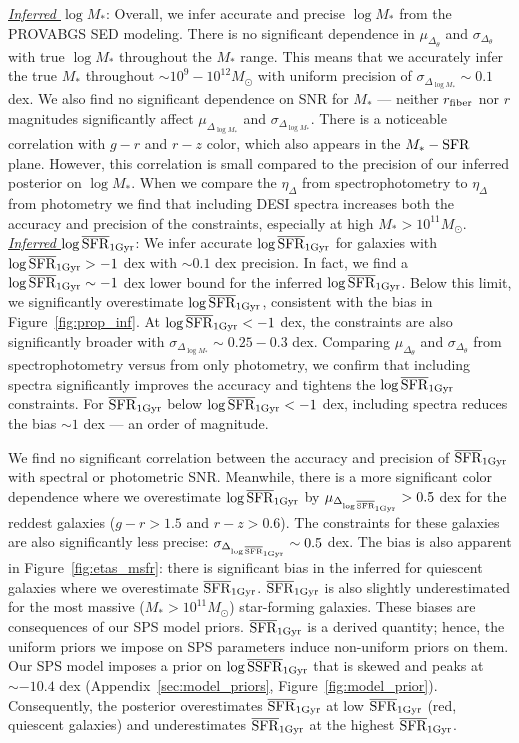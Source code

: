 \noindent \underline{\emph{Inferred $\log M_*$}}: 
Overall, we infer accurate and precise $\log M_*$ from the {\sc PROVABGS} SED
modeling. 
There is no significant dependence in $\mu_{\Delta_{\theta}}$ and
$\sigma_{\Delta_{\theta}}$ with true $\log M_*$ throughout the $M_*$ range. 
This means that we accurately infer the true $M_*$ throughout ${\sim}10^{9} -
10^{12} M_\odot$  with uniform precision of $\sigma_{\Delta_{\log M_*}} \sim 0.1$ dex. 
We also find no significant dependence on SNR for $M_*$ --- neither $r_{\rm
fiber}$ nor $r$ magnitudes significantly affect $\mu_{\Delta_{\log M_*}}$ and
$\sigma_{\Delta_{\log M_*}}$.
There is a noticeable correlation with $g-r$ and $r-z$ color, which also
appears in the $M_*-{\rm SFR}$ plane. 
However, this correlation is small compared to the precision of our inferred
posterior on $\log M_*$. 
When we compare the $\eta_\Delta$ from spectrophotometry to $\eta_\Delta$ from
photometry we find that including DESI spectra increases both the accuracy and
precision of the constraints, especially at high $M_* > 10^{11}M_\odot$. \\

\noindent \underline{\emph{Inferred $\log\overline{\rm SFR}_{\rm 1Gyr}$}}: 
We infer accurate $\log\overline{\rm SFR}_{\rm 1Gyr}$ for galaxies with $\log\overline{\rm SFR}_{\rm 1Gyr} > -1$ dex with
${\sim} 0.1$ dex precision. 
In fact, we find a $\log \overline{\rm SFR}_{\rm 1Gyr} \sim -1$ dex lower bound for the inferred
$\log \overline{\rm SFR}_{\rm 1Gyr}$.
Below this limit, we significantly overestimate $\log \overline{\rm SFR}_{\rm 1Gyr}$, consistent with
the bias in Figure~\ref{fig:prop_inf}. 
At $\log\overline{\rm SFR}_{\rm 1Gyr} < -1$ dex, the constraints are also significantly broader with
$\sigma_{\Delta_{\log M_*}}{\sim}0.25 - 0.3$ dex.
Comparing $\mu_{\Delta_{\theta}}$ and $\sigma_{\Delta_{\theta}}$ from
spectrophotometry versus from only photometry, we confirm that including
spectra significantly improves the accuracy and tightens the $\log\overline{\rm SFR}_{\rm 1Gyr}$
constraints.
For $\overline{\rm SFR}_{\rm 1Gyr}$ below $\log\overline{\rm SFR}_{\rm 1Gyr} < -1$ dex, including spectra reduces the bias
${\sim}1$ dex --- an order of magnitude. 

We find no significant correlation between the accuracy and precision of
$\overline{\rm SFR}_{\rm 1Gyr}$ with spectral or photometric SNR.
Meanwhile, there is a more significant color dependence where we overestimate
$\log\overline{\rm SFR}_{\rm 1Gyr}$ by $\mu_{\Delta_{\log\overline{\rm SFR}_{\rm 1Gyr}}}>0.5$ dex for the reddest galaxies
($g-r > 1.5$ and $r-z> 0.6$).
The constraints for these galaxies are also significantly less precise:
$\sigma_{\Delta_{\log\overline{\rm SFR}_{\rm 1Gyr}}} \sim 0.5$ dex. 
The bias is also apparent in Figure~\ref{fig:etas_msfr}: there is significant
bias in the inferred for quiescent galaxies where we overestimate $\overline{\rm SFR}_{\rm 1Gyr}$. 
$\overline{\rm SFR}_{\rm 1Gyr}$ is also slightly underestimated for the most massive ($M_* >
10^{11}M_\odot$) star-forming galaxies. 
These biases are consequences of our SPS model priors.
$\overline{\rm SFR}_{\rm 1Gyr}$ is a derived quantity; hence, the uniform priors we impose on SPS
parameters induce non-uniform priors on them.
Our SPS model imposes a prior on $\log \overline{\rm SSFR}_{\rm 1 Gyr}$
that is skewed and peaks at ${\sim}-10.4$ dex (Appendix~\ref{sec:model_priors}, Figure~\ref{fig:model_prior}). 
Consequently, the posterior overestimates $\overline{\rm SFR}_{\rm 1Gyr}$ at low $\overline{\rm SFR}_{\rm 1Gyr}$ (red,
quiescent galaxies) and underestimates $\overline{\rm SFR}_{\rm 1Gyr}$ at the highest $\overline{\rm SFR}_{\rm 1Gyr}$. \\

